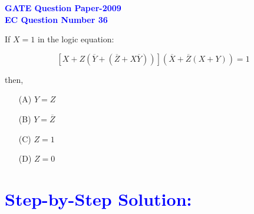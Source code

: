 \documentclass[a4paper,12pt]{article}
\begin{document}
\begin{center}
	{\LARGE \textbf{\textcolor{blue}{GATE Question Paper-2009}}}\\
	{\textbf{\textcolor{blue}{EC Question Number 36}}}
\end{center}

\vspace{1cm}

If $X = 1$ in the logic equation:

\[
\left[ X + Z \left( \overline{Y} + (\overline{Z} + X \overline{Y}) \right) \right] \left( \overline{X} + \overline{Z}(X + Y) \right) = 1
\]

then,

\begin{itemize}
    \item[(A)] $Y = Z$
    \item[(B)] $Y = \overline{Z}$
    \item[(C)] $Z = 1$
    \item[(D)] $Z = 0$
\end{itemize}

\vspace{0.5cm}

\section*{\textcolor{blue}{Step-by-Step Solution:}}

\vspace{0.3cm}
\end{document}
